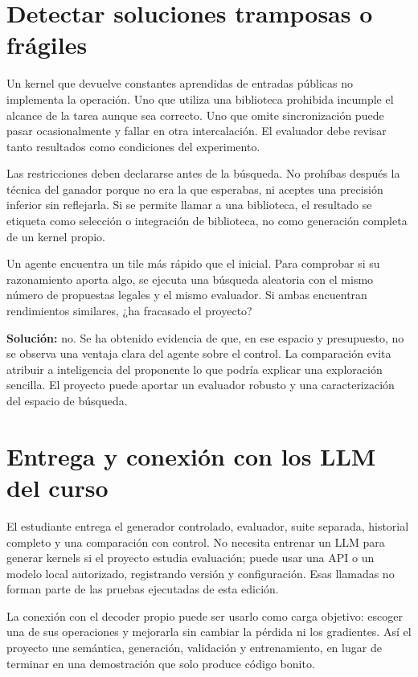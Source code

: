 \documentclass[12pt,a4paper,oneside]{report}
\begin{document}
\section{Detectar soluciones tramposas o frágiles}
Un kernel que devuelve constantes aprendidas de entradas públicas no implementa la operación. Uno que utiliza una biblioteca prohibida incumple el alcance de la tarea aunque sea correcto. Uno que omite sincronización puede pasar ocasionalmente y fallar en otra intercalación. El evaluador debe revisar tanto resultados como condiciones del experimento.

Las restricciones deben declararse antes de la búsqueda. No prohíbas después la técnica del ganador porque no era la que esperabas, ni aceptes una precisión inferior sin reflejarla. Si se permite llamar a una biblioteca, el resultado se etiqueta como selección o integración de biblioteca, no como generación completa de un kernel propio.

\begin{practica}
Un agente encuentra un tile más rápido que el inicial. Para comprobar si su razonamiento aporta algo, se ejecuta una búsqueda aleatoria con el mismo número de propuestas legales y el mismo evaluador. Si ambas encuentran rendimientos similares, ¿ha fracasado el proyecto?

\textbf{Solución:} no. Se ha obtenido evidencia de que, en ese espacio y presupuesto, no se observa una ventaja clara del agente sobre el control. La comparación evita atribuir a inteligencia del proponente lo que podría explicar una exploración sencilla. El proyecto puede aportar un evaluador robusto y una caracterización del espacio de búsqueda.

\end{practica}
\section{Entrega y conexión con los LLM del curso}
El estudiante entrega el generador controlado, evaluador, suite separada, historial completo y una comparación con control. No necesita entrenar un LLM para generar kernels si el proyecto estudia evaluación; puede usar una API o un modelo local autorizado, registrando versión y configuración. Esas llamadas no forman parte de las pruebas ejecutadas de esta edición.

La conexión con el decoder propio puede ser usarlo como carga objetivo: escoger una de sus operaciones y mejorarla sin cambiar la pérdida ni los gradientes. Así el proyecto une semántica, generación, validación y entrenamiento, en lugar de terminar en una demostración que solo produce código bonito.
\end{document}
